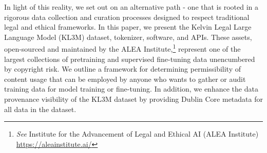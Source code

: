 In light of this reality, we set out on an alternative path - one that is rooted in a rigorous data collection and curation processes designed to respect traditional legal and ethical frameworks.  In this paper, we present the Kelvin Legal Large Language Model (KL3M) dataset, tokenizer, software, and APIs. These assets, open-sourced and maintained by the ALEA Institute,\footnote{\textit{See} Institute for the Advancement of Legal and Ethical AI (ALEA Institute) \url{https://aleainstitute.ai/} } represent one of the largest collections of pretraining and supervised fine-tuning data unencumbered by copyright risk.  We outline a framework for determining permissibility of content usage that can be employed by anyone who wants to gather or audit training data for model training or fine-tuning. In addition, we enhance the data provenance visibility of the KL3M dataset by providing Dublin Core metadata for all data in the dataset.\cite{park2009dublin}








